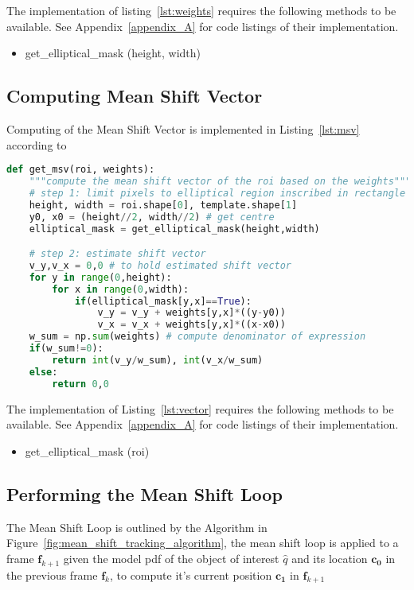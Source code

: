 The implementation of listing~\ref{lst:weights} requires the following methods to
be available. See Appendix~\ref{appendix_A} for code listings of their implementation. 
\begin{itemize}
    \item get\_elliptical\_mask (height, width)
\end{itemize}

\subsection{Computing Mean Shift Vector}
Computing of the Mean Shift Vector is implemented in Listing~\ref{lst:msv}
according to %

\begin{lstlisting}[language=Python, caption={Computing Mean Shift Vector}, captionpos=b, label={lst:msv}]
def get_msv(roi, weights):
    """compute the mean shift vector of the roi based on the weights"""
    # step 1: limit pixels to elliptical region inscribed in rectangle
    height, width = roi.shape[0], template.shape[1]
    y0, x0 = (height//2, width//2) # get centre 
    elliptical_mask = get_elliptical_mask(height,width)

    # step 2: estimate shift vector
    v_y,v_x = 0,0 # to hold estimated shift vector
    for y in range(0,height):
        for x in range(0,width): 
            if(elliptical_mask[y,x]==True):
                v_y = v_y + weights[y,x]*((y-y0)) 
                v_x = v_x + weights[y,x]*((x-x0))
    w_sum = np.sum(weights) # compute denominator of expression
    if(w_sum!=0):
        return int(v_y/w_sum), int(v_x/w_sum)
    else:
        return 0,0
\end{lstlisting}

The implementation of Listing~\ref{lst:vector} requires the following methods to
be available. See Appendix~\ref{appendix_A} for code listings of their implementation. 
\begin{itemize}
    \item get\_elliptical\_mask (roi)
\end{itemize}

\subsection{Performing the Mean Shift Loop}
The Mean Shift Loop is outlined by the Algorithm in
Figure~\ref{fig:mean_shift_tracking_algorithm}, the mean shift loop is
applied to a frame $\mathbf{f}_{k+1}$ given the model pdf of the object of
interest $\hat{q}$ and its location $\mathbf{c_0}$ in the previous frame
$\mathbf{f}_{k}$, to compute it's current position $\mathbf{c_1}$ in
$\mathbf{f}_{k+1}$

